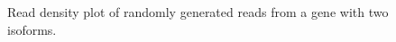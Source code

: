 \begin{figure}
    \begin{center}
        
    \end{center}
    \caption{Read density plot of randomly generated reads from a gene with two isoforms.}
    \label{twoisoform}
\end{figure}
